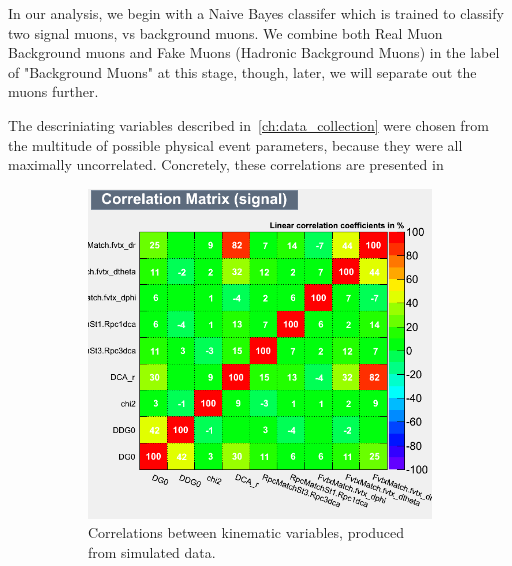 In our analysis, we begin with a Naive Bayes classifer which is trained to
classify two signal muons, vs background muons. We combine both Real Muon
Background muons and Fake Muons (Hadronic Background Muons) in the label of
"Background Muons" at this stage, though, later, we will separate out the muons
further.

The descriniating variables described in~\ref{ch:data_collection} were
chosen from the multitude of possible physical event parameters, because they
were all maximally uncorrelated. Concretely, these correlations are presented in

\begin{figure}[H]
	\centering
	\begin{subfigure}{0.5\textwidth}
		\centering
		\includegraphics[width=0.95\linewidth]{../Chapter5/fig/CorrelationMatrix_Signal.png}
		\caption{Correlations between kinematic variables, produced from simulated
			data.}
		\label{fig:corr_mat_sig}
	\end{subfigure}%
	\begin{subfigure}{0.5\textwidth}
		\centering

\end{subfigure}
\end{figure}
